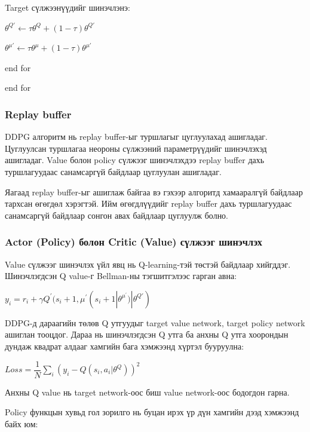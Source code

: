 \documentclass[12pt,A4]{report}
\begin{document}
\quad\quad Target сүлжээнүүдийг шинэчлэнэ:
\begin{center}
$\theta^{Q{'}} \longleftarrow \tau\theta^Q + (1-\tau)\theta^{Q{'}}$ 

$\theta^{\mu{'}} \longleftarrow \tau\theta^\mu + (1-\tau)\theta^{\mu{'}}$ 
\end{center}

\quad\quad end for

\quad end for

\subsubsection{Replay buffer}

DDPG алгоритм нь replay buffer-ыг туршлагыг цуглуулахад ашигладаг. Цуглуулсан туршлагаа неороны сүлжээний параметрүүдийг шинэчлэхэд ашигладаг. Value болон policy сүлжээг шинэчлэхдээ replay buffer дахь туршлагуудаас санамсаргүй байдлаар цуглуулан ашигладаг.

Яагаад replay buffer-ыг ашиглаж байгаа вэ гэхээр алгоритд хамааралгүй байдлаар тархсан өгөгдөл хэрэгтэй. Ийм өгөгдлүүдийг replay buffer дахь туршлагуудаас санамсаргүй байдлаар сонгон авах байдлаар цуглуулж болно.

\subsubsection{Actor (Policy) болон Critic (Value) сүлжээг шинэчлэх}

Value сүлжээг шинэчлэх үйл явц нь Q-learning-тэй төстэй байдлаар хийгддэг. Шинэчлэгдсэн Q value-г Bellman-ны тэгшитгэлээс гарган авна:

\begin{center}
$y_i=r_i+\gamma{Q^{'}}(s_i+1,\mu^{'}(s_i+1|\theta^{\mu^{'}})|\theta^{Q{'}})$
\end{center}

DDPG-д дараагийн төлөв Q утгуудыг target value network, target policy network ашиглан тооцдог. Дараа нь шинэчлэгдсэн Q утга ба анхны Q утга хоорондын дундаж квадрат алдааг хамгийн бага хэмжээнд хүртэл бууруулна:

\begin{center}
$Loss = \dfrac{1}{N}\sum_{i}(y_i-Q(s_i,a_i|\theta^Q))^2$
\end{center}

Анхны Q value нь target network-оос биш value network-оос бодогдон гарна. 

Policy функцын хувьд гол зорилго нь буцан ирэх үр дүн хамгийн дээд хэмжээнд байх юм:
\end{document}
